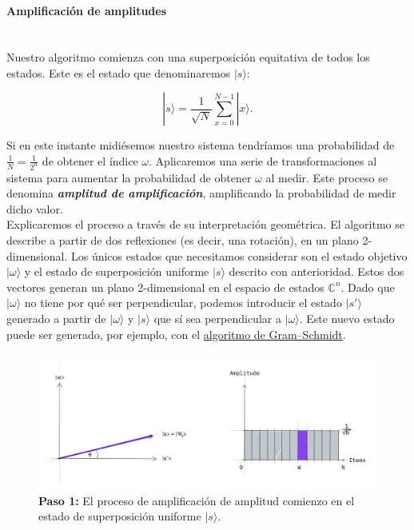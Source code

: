 \documentclass[11pt]{article}
\newcommand{\ra}{\rangle}
\newcommand{\myparagraph}[1]{\paragraph*{ \\ #1}\mbox{}\\}
\theoremstyle{plain}
\begin{document}
\myparagraph{Amplificación de amplitudes}

Nuestro algoritmo comienza con una superposición equitativa de todos los estados. Este es el estado que denominaremos $|s\ra$:

\[
	|s\ra = \frac{1}{\sqrt N} \sum_{x = 0}^{N-1} |x\ra.
\]

Si en este instante midiésemos nuestro sistema tendríamos una probabilidad de $\frac{1}{N} = \frac{1}{2^n}$ de obtener el índice $\omega$. Aplicaremos una serie de transformaciones al sistema para aumentar la probabilidad de obtener $\omega$ al medir. Este proceso se denomina \emph{\textbf{amplitud de amplificación}}, amplificando la probabilidad de medir dicho valor. \\

Explicaremos el proceso a través de su interpretación geométrica. El algoritmo se describe a partir de dos reflexiones (es decir, una rotación), en un plano 2-dimensional. Los únicos estados que necesitamos considerar son el estado objetivo $|\omega\ra$ y el estado de superposición uniforme $|s\ra$ descrito con anterioridad. Estos dos vectores generan un plano 2-dimensional en el espacio de estados $\mathbb{C}^{n}$. Dado que $|\omega\ra$ no tiene por qué ser perpendicular, podemos introducir el estado $|s'\ra$ generado a partir de $|\omega\ra$ y $|s\ra$ que sí sea perpendicular a $|\omega\ra$. Este nuevo estado puede ser generado, por ejemplo, con el  \href{https://en.wikipedia.org/wiki/Gram%E2%80%93Schmidt_process}{algoritmo de Gram–Schmidt}.

\begin{figure}[H]
	\centering
	\includegraphics[scale=0.5]{figures/grover_step1}
	\caption{\textbf{Paso 1:} El proceso de amplificación de amplitud comienzo en el estado de superposición uniforme $|s\ra$.}
\end{figure}
\end{document}
